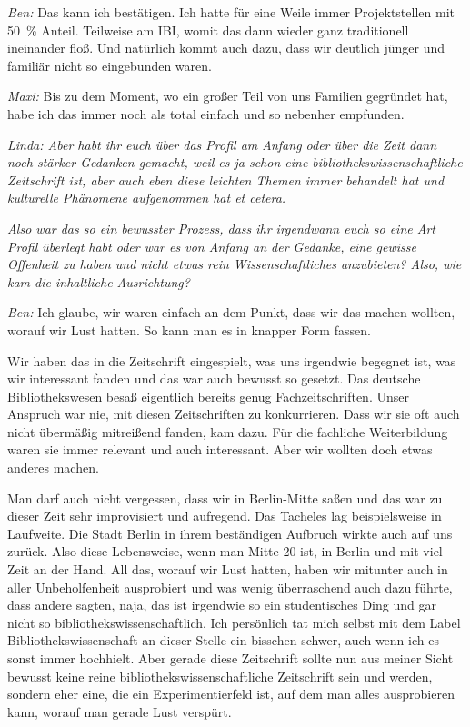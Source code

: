 \documentclass[a4paper,
fontsize=11pt,
oneside,
numbers=noperiodatend,
parskip=half-,
bibliography=totoc,
final
]{scrartcl}
\begin{document}
\emph{Ben:} Das kann ich bestätigen. Ich hatte für eine Weile immer
Projektstellen mit 50~\% Anteil. Teilweise am IBI, womit das dann wieder
ganz traditionell ineinander floß. Und natürlich kommt auch dazu, dass
wir deutlich jünger und familiär nicht so eingebunden waren.

\emph{Maxi:} Bis zu dem Moment, wo ein großer Teil von uns Familien
gegründet hat, habe ich das immer noch als total einfach und so nebenher
empfunden.

\emph{Linda: Aber habt ihr euch über das Profil am Anfang oder über die
Zeit dann noch stärker Gedanken gemacht, weil es ja schon eine
bibliothekswissenschaftliche Zeitschrift ist, aber auch eben diese
leichten Themen immer behandelt hat und kulturelle Phänomene aufgenommen
hat et cetera.}

\emph{Also war das so ein bewusster Prozess, dass ihr irgendwann euch so
eine Art Profil überlegt habt oder war es von Anfang an der Gedanke,
eine gewisse Offenheit zu haben und nicht etwas rein Wissenschaftliches
anzubieten? Also, wie kam die inhaltliche Ausrichtung?}

\emph{Ben:} Ich glaube, wir waren einfach an dem Punkt, dass wir das
machen wollten, worauf wir Lust hatten. So kann man es in knapper Form
fassen.

Wir haben das in die Zeitschrift eingespielt, was uns irgendwie begegnet
ist, was wir interessant fanden und das war auch bewusst so gesetzt. Das
deutsche Bibliothekswesen besaß eigentlich bereits genug
Fachzeitschriften. Unser Anspruch war nie, mit diesen Zeitschriften zu
konkurrieren. Dass wir sie oft auch nicht übermäßig mitreißend fanden,
kam dazu. Für die fachliche Weiterbildung waren sie immer relevant und
auch interessant. Aber wir wollten doch etwas anderes machen.

Man darf auch nicht vergessen, dass wir in Berlin-Mitte saßen und das
war zu dieser Zeit sehr improvisiert und aufregend. Das Tacheles lag
beispielsweise in Laufweite. Die Stadt Berlin in ihrem beständigen
Aufbruch wirkte auch auf uns zurück. Also diese Lebensweise, wenn man
Mitte 20 ist, in Berlin und mit viel Zeit an der Hand. All das, worauf
wir Lust hatten, haben wir mitunter auch in aller Unbeholfenheit
ausprobiert und was wenig überraschend auch dazu führte, dass andere
sagten, naja, das ist irgendwie so ein studentisches Ding und gar nicht
so bibliothekswissenschaftlich. Ich persönlich tat mich selbst mit dem
Label Bibliothekswissenschaft an dieser Stelle ein bisschen schwer, auch
wenn ich es sonst immer hochhielt. Aber gerade diese Zeitschrift sollte
nun aus meiner Sicht bewusst keine reine bibliothekswissenschaftliche
Zeitschrift sein und werden, sondern eher eine, die ein
Experimentierfeld ist, auf dem man alles ausprobieren kann, worauf man
gerade Lust verspürt.
\end{document}
